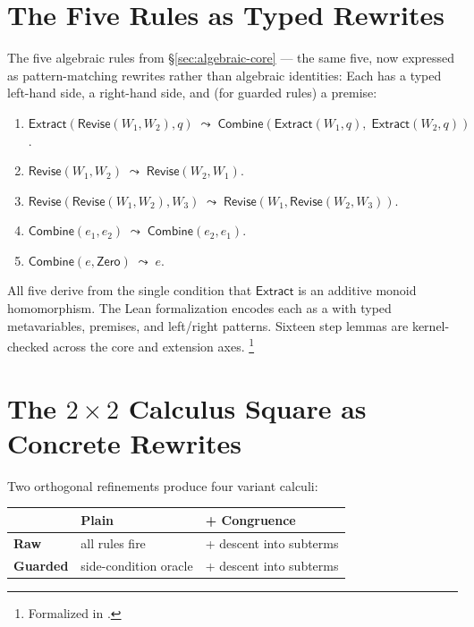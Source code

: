 \documentclass[11pt,openany]{report}
\begin{document}
\section{The Five Rules as Typed Rewrites}
\label{sec:five-as-rewrites}

The five algebraic rules from \S\ref{sec:algebraic-core} --- the
same five, now expressed as pattern-matching rewrites rather than
algebraic identities:  Each has a typed left-hand
side, a right-hand side, and (for guarded rules) a premise:

\begin{enumerate}
\item $\mathsf{Extract}(\mathsf{Revise}(W_1, W_2), q) \;\leadsto\;
  \mathsf{Combine}(\mathsf{Extract}(W_1, q),\;
  \mathsf{Extract}(W_2, q))$.

\item $\mathsf{Revise}(W_1, W_2) \;\leadsto\;
  \mathsf{Revise}(W_2, W_1)$.

\item $\mathsf{Revise}(\mathsf{Revise}(W_1, W_2), W_3)
  \;\leadsto\; \mathsf{Revise}(W_1, \mathsf{Revise}(W_2, W_3))$.

\item $\mathsf{Combine}(e_1, e_2) \;\leadsto\;
  \mathsf{Combine}(e_2, e_1)$.

\item $\mathsf{Combine}(e, \mathsf{Zero}) \;\leadsto\; e$.
\end{enumerate}

\noindent
All five derive from the single condition that $\mathsf{Extract}$ is
an additive monoid homomorphism.  The Lean formalization encodes each
as a  with typed metavariables, premises, and
left/right patterns.  Sixteen step lemmas are kernel-checked across
the core and extension axes.%
\footnote{Formalized in
.}


\section{The \texorpdfstring{$2 \times 2$}{2x2} Calculus Square
  as Concrete Rewrites}

Two orthogonal refinements produce four variant calculi:

\begin{center}
\begin{tabular}{lll}
\toprule
& \textbf{Plain} & \textbf{+ Congruence} \\
\midrule
\textbf{Raw} & all rules fire & + descent into subterms \\
\textbf{Guarded} & side-condition oracle & + descent into subterms \\
\bottomrule
\end{tabular}
\end{center}
\end{document}
